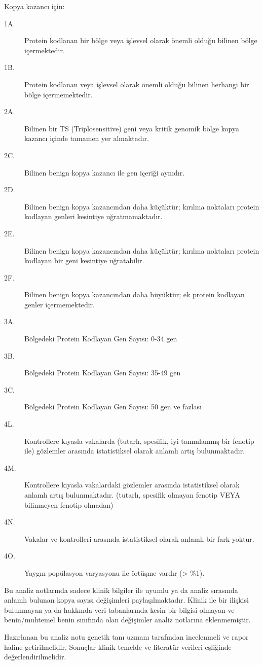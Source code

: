 \documentclass{article}
\begin{document}
Kopya kazancı için:
\begin{description}
\item[1A.] Protein kodlanan bir bölge veya işlevsel olarak önemli olduğu bilinen bölge içermektedir.
\item[1B.] Protein kodlanan veya işlevsel olarak önemli olduğu bilinen herhangi bir bölge içermemektedir.
\item[2A.] Bilinen bir TS (Triplosensitive) geni veya kritik genomik bölge kopya kazancı içinde tamamen yer almaktadır.
\item[2C.] Bilinen benign kopya kazancı ile gen içeriği aynıdır.
\item[2D.] Bilinen benign kopya kazancından daha küçüktür; kırılma noktaları protein kodlayan genleri kesintiye uğratmamaktadır.
\item[2E.] Bilinen benign kopya kazancından daha küçüktür; kırılma noktaları protein kodlayan bir geni kesintiye uğratabilir.
\item[2F.] Bilinen benign kopya kazancından daha büyüktür; ek protein kodlayan genler içermemektedir.
\item[3A.] Bölgedeki Protein Kodlayan Gen Sayısı: 0-34 gen
\item[3B.] Bölgedeki Protein Kodlayan Gen Sayısı: 35-49 gen
\item[3C.] Bölgedeki Protein Kodlayan Gen Sayısı: 50 gen ve fazlası
\item[4L.] Kontrollere kıyasla vakalarda (tutarlı, spesifik, iyi tanımlanmış bir fenotip ile) gözlemler arasında istatistiksel olarak anlamlı artış bulunmaktadır.
\item[4M.] Kontrollere kıyasla vakalardaki gözlemler arasında istatistiksel olarak anlamlı artış bulunmaktadır. (tutarlı, spesifik olmayan fenotip VEYA bilinmeyen fenotip olmadan)
\item[4N.] Vakalar ve kontrolleri arasında istatistiksel olarak anlamlı bir fark yoktur.
\item[4O.] Yaygın popülasyon varyasyonu ile örtüşme vardır (> \%1). 
\end{description}

Bu analiz notlarında sadece klinik bilgiler ile uyumlu ya da analiz sırasında anlamlı bulunan kopya sayısı değişimleri paylaşılmaktadır. Klinik ile bir ilişkisi bulunmayan ya da hakkında veri tabanlarında kesin bir bilgisi olmayan ve benin/muhtemel benin sınıfında olan değişimler analiz notlarına eklenmemiştir.

Hazırlanan bu analiz notu genetik tanı uzmanı tarafından incelenmeli ve rapor haline getirilmelidir. Sonuçlar klinik temelde ve literatür verileri eşliğinde değerlendirilmelidir.
\end{document}
